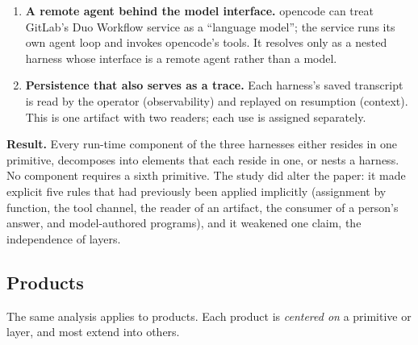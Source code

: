 \begin{enumerate}
\item
  \textbf{A remote agent behind the model interface.} opencode can treat GitLab's Duo Workflow service as a ``language model''; the service runs its own agent loop and invokes opencode's tools. It resolves only as a nested harness whose interface is a remote agent rather than a model.
\item
  \textbf{Persistence that also serves as a trace.} Each harness's saved transcript is read by the operator (observability) and replayed on resumption (context). This is one artifact with two readers; each use is assigned separately.
\end{enumerate}

\textbf{Result.} Every run-time component of the three harnesses either resides in one primitive, decomposes into elements that each reside in one, or nests a harness. No component requires a sixth primitive. The study did alter the paper: it made explicit five rules that had previously been applied implicitly (assignment by function, the tool channel, the reader of an artifact, the consumer of a person's answer, and model-authored programs), and it weakened one claim, the independence of layers.

\subsection{Products}

The same analysis applies to products. Each product is \emph{centered on} a primitive or layer, and most extend into others.

